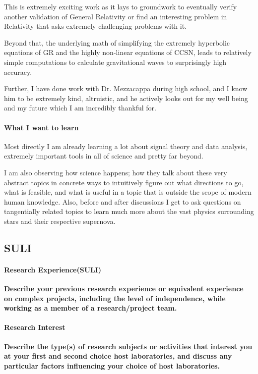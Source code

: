 This is extremely exciting work as it lays to groundwork to eventually verify another validation of General Relativity or find an
interesting problem in Relativity that asks extremely challenging problems with it.

Beyond that, the underlying math of simplifying the extremely hyperbolic equations of GR and the highly non-linear equations
of CCSN, leads to relatively simple computations to calculate gravitational waves to surprisingly high accuracy.

Further, I have done work with Dr. Mezzacappa during high school, and I know him to be extremely kind, altruistic, and he actively looks out for my well being and my future which I am incredibly thankful for.

\paragraph{What I want to learn}

Most directly I am already learning a lot about signal theory and data analysis, extremely important tools in all of science and
pretty far beyond.

I am also observing how science happens; how they talk about these very abstract topics in concrete ways to intuitively figure
out what directions to go, what is feasible, and what is useful in a topic that is outside the scope of modern human knowledge.
Also, before and after discussions I get to ask questions on tangentially related topics to learn much more about the vast
physics surrounding stars and their respective supernova.

\subsection{SULI}

\paragraph{Research Experience(SULI)}
\textbf{Describe your previous research experience or equivalent experience on complex projects, including the level of independence, while working as a member of a research/project team.}




\paragraph{Research Interest}
\textbf{Describe the type(s) of research subjects or activities that interest you at your first and second choice host laboratories, and discuss any particular factors influencing your choice of host laboratories.}




